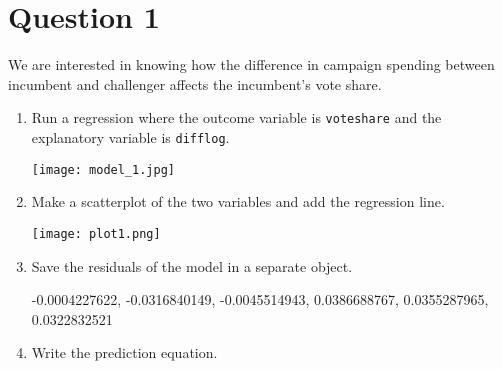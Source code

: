 \documentclass[12pt,letterpaper]{article}
\begin{document}
\section*{Question 1}
\vspace{.25cm}
\noindent We are interested in knowing how the difference in campaign spending between incumbent and challenger affects the incumbent's vote share. 
	\begin{enumerate}
		\item Run a regression where the outcome variable is \texttt{voteshare} and the explanatory variable is \texttt{difflog}.	\vspace{5cm}
		
			 
			\texttt{[image: model\_1.jpg]}
			
		\item Make a scatterplot of the two variables and add the regression line. 	
			\vspace{.5cm}
			
				 
		\centering
		\texttt{[image: plot1.png]}
		\vspace{.5cm}
		\item Save the residuals of the model in a separate object.	\vspace{0.2cm}
			 
-0.0004227622, -0.0316840149, -0.0045514943,  0.0386688767,  0.0355287965, 0.0322832521 
		\item Write the prediction equation.
			 
	\end{enumerate}
	
\newpage
\end{document}
